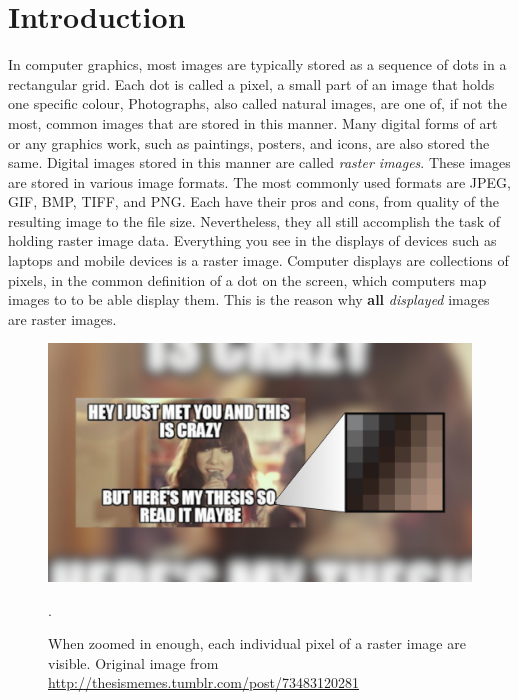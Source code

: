 \chapter{Introduction} \label{sec:intro}

In computer graphics, most images are typically stored as a sequence of dots in a rectangular grid. Each dot is called a pixel, a small part of an image that holds one specific colour, Photographs, also called natural images\cite{hoshyari2018perceptiondriven}, are one of, if not the most, common images that are stored in this manner. Many digital forms of art or any graphics work, such as paintings, posters, and icons, are also stored the same. Digital images stored in this manner are called \textit{raster images}. These images are stored in various image formats. The most commonly used formats are JPEG, GIF, BMP, TIFF, and PNG. Each have their pros and cons, from quality of the resulting image to the file size. Nevertheless, they all still accomplish the task of holding raster image data. Everything you see in the displays of devices such as laptops and mobile devices is a raster image. Computer displays are collections of pixels, in the common definition of a dot on the screen, which computers map images to to be able display them. This is the reason why \textbf{all} \textit{displayed} images are raster images.

\begin{figure}[h]
	\centering
	\includegraphics[scale=1.0]{images/chap01-introduction/raster-images-upclose.png}
	\caption{When zoomed in enough, each individual pixel of a raster image are visible. Original image from \protect\url{http://thesismemes.tumblr.com/post/73483120281}}.
	\label{fig:raster-images-upcose}
\end{figure}

